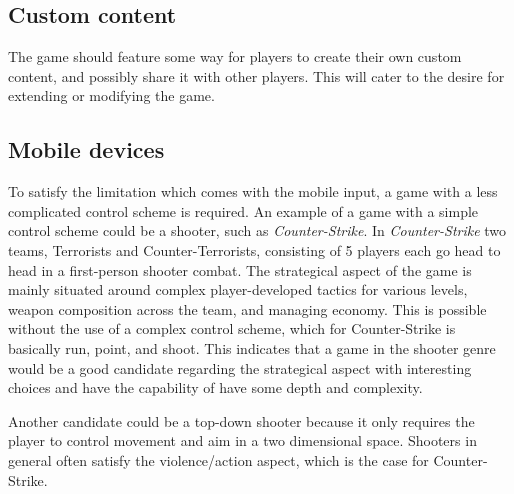 \subsection{Custom content}\label{sec:selectionofgametype:customcontent}
The game should feature some way for players to create their own custom content, and possibly share it with other players.
This will cater to the desire for extending or modifying the game.

\subsection{Mobile devices}\label{sec:selectionofgametype:mobiledevices}
To satisfy the limitation which comes with the mobile input, a game with a less complicated control scheme is required.
An example of a game with a simple control scheme could be a shooter, such as \textit{Counter-Strike}.\cite{counterstrike}
In \textit{Counter-Strike} two teams, Terrorists and Counter-Terrorists,
consisting of 5 players each go head to head in a first-person shooter combat.
The strategical aspect of the game is mainly situated around complex
player-developed tactics for various levels, weapon composition across the
team, and managing economy. This is possible without the use of a complex
control scheme, which for Counter-Strike is basically run, point, and shoot.
This indicates that a game in the shooter genre would
be a good candidate regarding the strategical aspect with interesting choices
and have the capability of have some depth and complexity.

Another candidate could be a top-down shooter because it only requires the
player to control movement and aim in a two dimensional space. Shooters in
general often satisfy the violence/action aspect, which is the case for
Counter-Strike.

